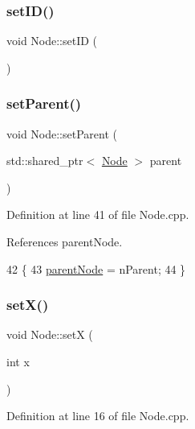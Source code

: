 \mbox{\label{class_node_ae2ecbbfa7ede81db532c484e7e134fe6}} 
\subsubsection{\texorpdfstring{set\+I\+D()}{setID()}}
{\footnotesize\ttfamily void Node\+::set\+ID (\begin{DoxyParamCaption}{ }\end{DoxyParamCaption})}

\mbox{\label{class_node_a5889e5c01190f75a7074e00c76f6a68a}} 
\subsubsection{\texorpdfstring{set\+Parent()}{setParent()}}
{\footnotesize\ttfamily void Node\+::set\+Parent (\begin{DoxyParamCaption}\item[{std\+::shared\+\_\+ptr$<$ \hyperlink{class_node}{Node} $>$}]{parent }\end{DoxyParamCaption})}



Definition at line 41 of file Node.\+cpp.



References parent\+Node.


\begin{DoxyCode}
42 \{
43     \hyperlink{class_node_aface6c6a7d38a7cc94090ef35bf9e95a}{parentNode} = nParent;
44 \}
\end{DoxyCode}
\mbox{\label{class_node_adb106b3c9cca356ce404d45ce9ef1a89}} 
\subsubsection{\texorpdfstring{set\+X()}{setX()}}
{\footnotesize\ttfamily void Node\+::setX (\begin{DoxyParamCaption}\item[{int}]{x }\end{DoxyParamCaption})}



Definition at line 16 of file Node.\+cpp.



